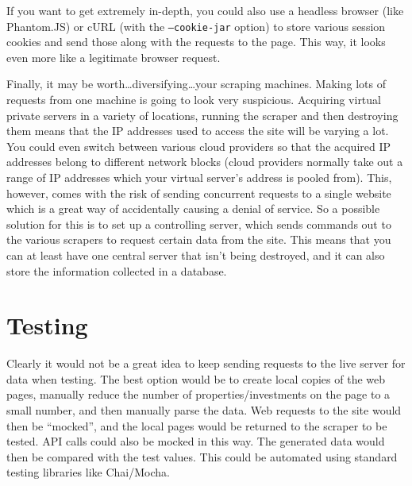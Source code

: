 \documentclass{article}
\begin{document}
If you want to get extremely in-depth, you could also use a headless browser
(like Phantom.JS) or cURL (with the \texttt{--cookie-jar} option) to store
various session cookies and send those along with the requests to the page. This
way, it looks even more like a legitimate browser request.

Finally, it may be worth\ldots diversifying\ldots your scraping machines. Making
lots of requests from one machine is going to look very suspicious. Acquiring
virtual private servers in a variety of locations, running the scraper and then
destroying them means that the IP addresses used to access the site will be
varying a lot. You could even switch between various cloud providers so that the
acquired IP addresses belong to different network blocks (cloud providers
normally take out a range of IP addresses which your virtual server's address is pooled
from).
This, however, comes with the risk of sending concurrent requests to a single
website which is a great way of accidentally causing a denial of service. So a
possible solution for this is to set up a controlling server, which sends
commands out to the various scrapers to request certain data from the site. This
means that you can at least have one central server that isn't being destroyed,
and it can also store the information collected in a database.

\section*{Testing}
Clearly it would not be a great idea to keep sending requests to the live server
for data when testing. The best option would be to create local copies of the
web pages, manually reduce the number of properties/investments on the page to a
small number, and then manually parse the data. Web requests to the site would
then be ``mocked'', and the local pages would be returned to the scraper to be
tested. API calls could also be mocked in this way. The generated data would
then be compared with the test values. This could be automated using standard
testing libraries like Chai/Mocha.
\end{document}
